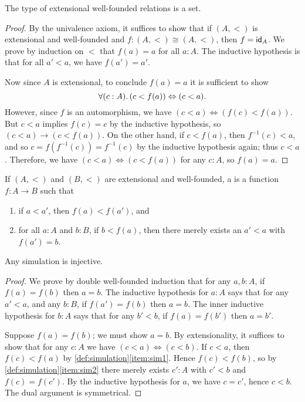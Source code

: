 \begin{thm}
  The type of extensional well-founded relations is a set.
\end{thm}
\begin{proof}
  By the univalence axiom, it suffices to show that if $(A,<)$ is extensional and well-founded and $f:(A,<) \cong (A,<)$, then $f=\idfunc[A]$.
  We prove by induction on $<$ that $f(a)=a$ for all $a:A$.
  The inductive hypothesis is that for all $a'<a$, we have $f(a')=a'$.

  Now since $A$ is extensional, to conclude $f(a)=a$ it is sufficient to show
  \[\fall{c:A}(c<f(a)) \Leftrightarrow (c<a).\]
  However, since $f$ is an automorphism, we have $(c<a) \Leftrightarrow (f(c)<f(a))$.
  But $c<a$ implies $f(c)=c$ by the inductive hypothesis, so $(c<a) \to (c<f(a))$.
  On the other hand, if $c<f(a)$, then $f^{-1}(c)<a$, and so $c = f(f^{-1}(c)) = f^{-1}(c)$ by the inductive hypothesis again; thus $c<a$.
  Therefore, we have $(c<a) \Leftrightarrow (c<f(a))$ for any $c:A$, so $f(a)=a$.
\end{proof}

\begin{defn}\label{def:simulation}
  If $(A,<)$ and $(B,<)$ are extensional and well-founded, a 
  is a function $f:A\to B$ such that
  \begin{enumerate}
  \item if $a<a'$, then $f(a)<f(a')$, and\label{item:sim1}
  \item for all $a:A$ and $b:B$, if $b<f(a)$, then there merely exists an $a'<a$ with $f(a')=b$.\label{item:sim2}
  \end{enumerate}
\end{defn}

\begin{lem}
  Any simulation is injective.
\end{lem}
\begin{proof}
  We prove by double well-founded induction that for any $a,b:A$, if $f(a)=f(b)$ then $a=b$.
  The inductive hypothesis for $a:A$ says that for any $a'<a$, and any $b:B$, if $f(a')=f(b)$ then $a=b$.
  The inner inductive hypothesis for $b:A$ says that for any $b'<b$, if $f(a)=f(b')$ then $a=b'$.

  Suppose $f(a)=f(b)$; we must show $a=b$.
  By extensionality, it suffices to show that for any $c:A$ we have $(c<a)\Leftrightarrow (c<b)$.
  If $c<a$, then $f(c)<f(a)$ by \autoref{def:simulation}\ref{item:sim1}.
  Hence $f(c)<f(b)$, so by \autoref{def:simulation}\ref{item:sim2} there merely exists $c':A$ with $c'<b$ and $f(c)=f(c')$.
  By the inductive hypothesis for $a$, we have $c=c'$, hence $c<b$.
  The dual argument is symmetrical.
\end{proof}

